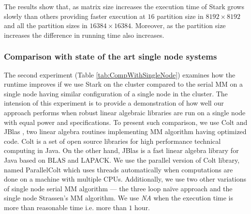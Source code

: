 The results show that, as matrix size increases the execution time of Stark grows slowly than others providing faster execution at $16$ partition size in $8192\times 8192$ and all the partition sizes in $16384\times 16384$. Moreover, as the partition size increases the difference in running time also increases. 

\subsubsection{Comparison with state of the art single node systems}
The second experiment (Table \ref{tab:CompWithSingleNode}) examines how the runtime improves if we use Stark on the cluster compared to the serial MM on a single node having similar configuration of a single node in the cluster. The intension of this experiment is to provide a demonstration of how well our approach performs when robust linear algebraic libraries are run on a single node with equal power and specifications. To present such comparison, we use Colt \cite{colt} and JBlas \cite{jblas}, two linear algebra routines implementing MM algorithm having optimized code. Colt is a set of open source libraries for high performance technical computing in Java. On the other hand, JBlas is a fast linear algebra library for Java based on BLAS and LAPACK. We use the parallel version of Colt library, named ParallelColt \cite{wendykier2010parallel} which uses threads automatically when computations are done on a machine with multiple CPUs. Additionally, we use two other variations of single node serial MM algorithm --- the three loop na\"{i}ve approach and the single node Strassen's MM algorithm. We use \textit{NA} when the execution time is more than reasonable time i.e. more than $1$ hour. 

